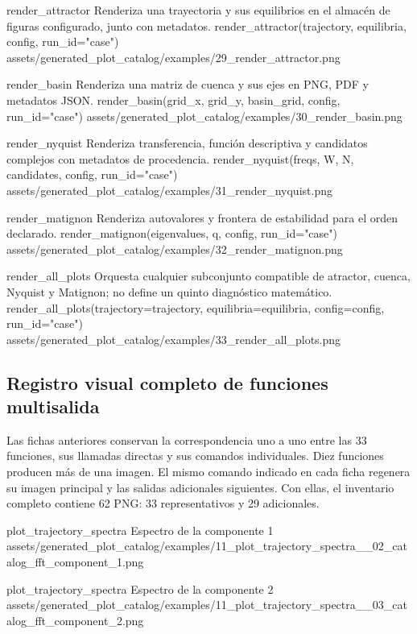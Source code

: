 \plotcatalogentry
  {render_attractor}
  {Renderiza una trayectoria y sus equilibrios en el almacén de figuras
  configurado, junto con metadatos.}
  {render_attractor(trajectory, equilibria, config, run_id="case")}
  {assets/generated_plot_catalog/examples/29_render_attractor.png}

\plotcatalogentry
  {render_basin}
  {Renderiza una matriz de cuenca y sus ejes en PNG, PDF y metadatos JSON.}
  {render_basin(grid_x, grid_y, basin_grid, config, run_id="case")}
  {assets/generated_plot_catalog/examples/30_render_basin.png}

\plotcatalogentry
  {render_nyquist}
  {Renderiza transferencia, función descriptiva y candidatos complejos con
  metadatos de procedencia.}
  {render_nyquist(freqs, W, N, candidates, config, run_id="case")}
  {assets/generated_plot_catalog/examples/31_render_nyquist.png}

\plotcatalogentry
  {render_matignon}
  {Renderiza autovalores y frontera de estabilidad para el orden declarado.}
  {render_matignon(eigenvalues, q, config, run_id="case")}
  {assets/generated_plot_catalog/examples/32_render_matignon.png}

\plotcatalogentry
  {render_all_plots}
  {Orquesta cualquier subconjunto compatible de atractor, cuenca, Nyquist y
  Matignon; no define un quinto diagnóstico matemático.}
  {render_all_plots(trajectory=trajectory, equilibria=equilibria, config=config, run_id="case")}
  {assets/generated_plot_catalog/examples/33_render_all_plots.png}

\subsection{Registro visual completo de funciones multisalida}

Las fichas anteriores conservan la correspondencia uno a uno entre las 33
funciones, sus llamadas directas y sus comandos individuales. Diez funciones
producen más de una imagen. El mismo comando
indicado en cada ficha regenera su imagen principal y las salidas
adicionales siguientes. Con ellas, el inventario completo contiene 62 PNG:
33 representativos y 29 adicionales.

\plotcatalogextra
  {plot_trajectory_spectra}
  {Espectro de la componente 1}
  {assets/generated_plot_catalog/examples/11_plot_trajectory_spectra__02_catalog_fft_component_1.png}

\plotcatalogextra
  {plot_trajectory_spectra}
  {Espectro de la componente 2}
  {assets/generated_plot_catalog/examples/11_plot_trajectory_spectra__03_catalog_fft_component_2.png}

